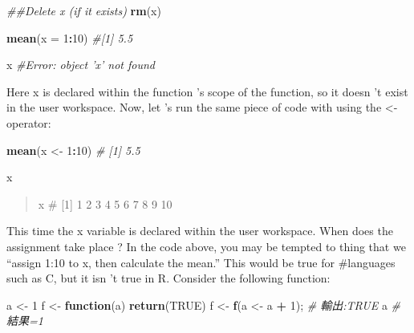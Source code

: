 \documentclass[]{book}
\newenvironment{Shaded}{\begin{snugshade}}{\end{snugshade}}
\newcommand{\CommentTok}[1]{\textcolor[rgb]{0.56,0.35,0.01}{\textit{#1}}}
\newcommand{\ControlFlowTok}[1]{\textcolor[rgb]{0.13,0.29,0.53}{\textbf{#1}}}
\newcommand{\DataTypeTok}[1]{\textcolor[rgb]{0.13,0.29,0.53}{#1}}
\newcommand{\DecValTok}[1]{\textcolor[rgb]{0.00,0.00,0.81}{#1}}
\newcommand{\KeywordTok}[1]{\textcolor[rgb]{0.13,0.29,0.53}{\textbf{#1}}}
\newcommand{\NormalTok}[1]{#1}
\newcommand{\OperatorTok}[1]{\textcolor[rgb]{0.81,0.36,0.00}{\textbf{#1}}}
\newcommand{\OtherTok}[1]{\textcolor[rgb]{0.56,0.35,0.01}{#1}}
\newcommand{\StringTok}[1]{\textcolor[rgb]{0.31,0.60,0.02}{#1}}
\theoremstyle{definition}
\theoremstyle{definition}
\theoremstyle{definition}
\theoremstyle{remark}
\begin{document}
\begin{Shaded}
\begin{Highlighting}[]

\CommentTok{##Delete x (if it exists)}
\KeywordTok{rm}\NormalTok{(x)}
\end{Highlighting}
\end{Shaded}

\begin{Shaded}
\begin{Highlighting}[]
\KeywordTok{mean}\NormalTok{(}\DataTypeTok{x =} \DecValTok{1}\OperatorTok{:}\DecValTok{10}\NormalTok{) }\CommentTok{#[1] 5.5}
\end{Highlighting}
\end{Shaded}

\begin{Shaded}
\begin{Highlighting}[]
\NormalTok{x }\CommentTok{#Error: object 'x' not found}
\end{Highlighting}
\end{Shaded}

Here x is declared within the function 's scope of the function, so it
doesn 't exist in the user workspace. Now, let 's run the same piece of
code with using the \textless{}- operator:

\begin{Shaded}
\begin{Highlighting}[]
\KeywordTok{mean}\NormalTok{(x <-}\StringTok{ }\DecValTok{1}\OperatorTok{:}\DecValTok{10}\NormalTok{) }\CommentTok{# [1] 5.5}
\end{Highlighting}
\end{Shaded}

\begin{Shaded}
\begin{Highlighting}[]
\NormalTok{x}
\end{Highlighting}
\end{Shaded}

\begin{quote}
x \# {[}1{]} 1 2 3 4 5 6 7 8 9 10
\end{quote}

This time the x variable is declared within the user workspace. When
does the assignment take place ? In the code above, you may be tempted
to thing that we ``assign 1:10 to x, then calculate the mean.'' This
would be true for \#languages such as C, but it isn 't true in R.
Consider the following function:

\begin{Shaded}
\begin{Highlighting}[]
\NormalTok{a <-}\StringTok{ }\DecValTok{1}
\NormalTok{f <-}\StringTok{ }\ControlFlowTok{function}\NormalTok{(a) }\KeywordTok{return}\NormalTok{(}\OtherTok{TRUE}\NormalTok{)}
\NormalTok{f <-}\StringTok{ }\KeywordTok{f}\NormalTok{(a <-}\StringTok{ }\NormalTok{a }\OperatorTok{+}\StringTok{ }\DecValTok{1}\NormalTok{);}
\CommentTok{# 輸出:TRUE}
\NormalTok{a }\CommentTok{# 結果=1 }
\end{Highlighting}
\end{Shaded}
\end{document}
